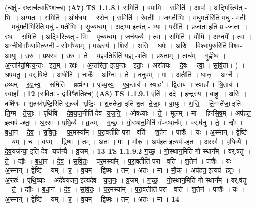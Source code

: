 \documentclass[17pt]{extarticle}
\begin{document}
                  \newline
                      (चक्षु॑ - र॒ष्टाच॑त्वारिꣳशच्च)  \textbf{(A7)} \newline \newline
                                \textbf{ TS 1.1.8.1} \newline
                  समिति॑ । व॒पा॒मि॒ । समिति॑ । आपः॑ । अ॒द्भिरित्य॑त् - भिः । अ॒ग्म॒त॒ । समिति॑ । ओष॑धयः । रसे॑न । समिति॑ । रे॒वतीः᳚ । जग॑तीभिः । मधु॑मती॒रिति॒ मधु॑ - म॒तीः॒ । मधु॑मतीभि॒रिति॒ मधु॑ - म॒ती॒भिः॒ । सृ॒ज्य॒ध्व॒म् । अ॒द्भ्य इत्य॑त् - भ्यः । परीति॑ । प्रजा॑ता॒ इति॒ प्र -जा॒ताः॒ । स्थ॒ । समिति॑ । अ॒द्भिरित्य॑त् - भिः । पृ॒च्य॒ध्व॒म् । जन॑यत्यै । त्वा॒ । समिति॑ । यौ॒मि॒ । अ॒ग्नये᳚ । त्वा॒ । अ॒ग्नीषोमा᳚भ्या॒मित्य॒ग्नी - सोमा᳚भ्याम् । म॒खस्य॑ । शिरः॑ । अ॒सि॒ । घ॒र्मः । अ॒सि॒ । वि॒श्वायु॒रुरिति॑ वि॒श्व- आ॒युः॒ । उ॒रु । प्र॒थ॒स्व॒ । उ॒रु । ते॒ । य॒ज्ञ्प॑ति॒रिति॑ य॒ज्ञ् -प॒तिः॒ । प्र॒थ॒ता॒म् । त्वच᳚म् । गृ॒ह्णी॒ष्व॒ । अ॒न्तरि॑त॒मित्य॒न्तः - इ॒त॒म् । रक्षः॑ । अ॒न्तरि॑ता॒ इत्य॒न्तः - इ॒ताः॒ । अरा॑तयः । दे॒वः । त्वा॒ । स॒वि॒ता ( ) । श्र॒प॒य॒तु॒ । वर्.षि॑ष्ठे । अधीति॑ । नाके᳚ । अ॒ग्निः । ते॒ । त॒नुव᳚म् । मा । अतीति॑ । धा॒क् । अग्ने᳚ । ह॒व्यम् । र॒क्ष॒स्व॒ । समिति॑ । ब्रह्म॑णा । पृ॒च्य॒स्व॒ । ए॒क॒ताय॑ । स्वाहा᳚ । द्वि॒ताय॑ । स्वाहा᳚ । त्रि॒ताय॑ । स्वाहा᳚ ॥ \textbf{  12 } \newline
                  \newline
                      (स॒वि॒ता - द्वाविꣳ॑शतिश्च)  \textbf{(A8)} \newline \newline
                                \textbf{ TS 1.1.9.1} \newline
                  एति॑ । द॒दे॒ । इन्द्र॑स्य । बा॒हुः । अ॒सि॒ । दक्षि॑णः । स॒हस्र॑भृष्टि॒रिति॑ स॒हस्र॑ -भृ॒ष्टिः॒ । श॒तते॑जा॒ इति॑ श॒त -ते॒जाः॒ । वा॒युः । अ॒सि॒ । ति॒ग्मते॑जा॒ इति॑ ति॒ग्म - ते॒जाः॒ । पृथि॑वि । दे॒व॒य॒ज॒नीति॑ देव -य॒ज॒नि॒ । ओष॑ध्याः । ते॒ । मूल᳚म् । मा । हिꣳ॒॒सि॒ष॒म् । अप॑हत॒ इत्यप॑ -ह॒तः॒ । अ॒ररुः॑ । पृ॒थि॒व्यै । व्र॒जम् । ग॒च्छ॒ । गो॒स्थान॒मिति॑ गो-स्थान᳚म् । वर्.ष॑तु । ते॒ । द्यौः । ब॒धा॒न । दे॒व॒ । स॒वि॒तः॒ । प॒र॒मस्या᳚म् । प॒रा॒वतीति॑ परा - वति॑ । श॒तेन॑ । पाशैः᳚ । यः । अ॒स्मान् । द्वेष्टि॑ । यम् । च॒ । व॒यम् । द्वि॒ष्मः । तम् । अतः॑ । मा । मौ॒क् । अप॑हत॒ इत्यप॑ -ह॒तः॒ । अ॒ररुः॑ । पृ॒थि॒व्यै । दे॒व॒यज॑न्या॒ इति॑ देव -यज॑न्यै । व्र॒जम् । \textbf{  13} \newline
                  \newline
                                \textbf{ TS 1.1.9.2} \newline
                  ग॒च्छ॒ । गो॒स्थान॒मिति॑ गो-स्थान᳚म् । वर्.ष॑तु । ते॒ । द्यौः । ब॒धा॒न । दे॒व॒ । स॒वि॒तः॒ । पर॒मस्या᳚म् । प॒रा॒वतीति॑ परा - वति॑ । श॒तेन॑ । पाशैः᳚ । यः । अ॒स्मान् । द्वेष्टि॑ । यम् । च॒ । व॒यम् । द्वि॒ष्मः । तम् । अतः॑ । मा । मौ॒क् । अप॑हत॒ इत्यप॑ -ह॒तः॒ । अ॒ररुः॑ । पृ॒थि॒व्याः । अदे॑वयजन॒ इत्यदे॑व - य॒ज॒नः॒ । व्र॒जम् । ग॒च्छ॒ । गो॒स्थान॒मिति॑ गो-स्थान᳚म् । वर्.ष॑तु । ते॒ । द्यौः । ब॒धा॒न । दे॒व॒ । स॒वि॒तः॒ । प॒र॒मस्या᳚म् । प॒रा॒वतीति॑ परा - वति॑ । श॒तेन॑ । पाशैः᳚ । यः । अ॒स्मान् । द्वेष्टि॑ । यम् । च॒ । व॒यम् । द्वि॒ष्मः । तम् । अतः॑ । मा । \textbf{  14} \newline
\end{document}
